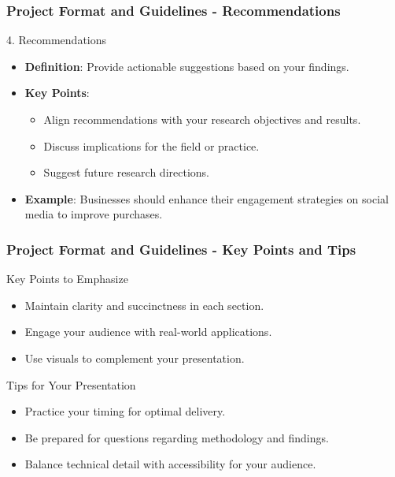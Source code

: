 \documentclass[aspectratio=169]{beamer}
\begin{document}
\begin{frame}[fragile]
    \frametitle{Project Format and Guidelines - Recommendations}
    \begin{block}{4. Recommendations}
        \begin{itemize}
            \item \textbf{Definition}: Provide actionable suggestions based on your findings.
            \item \textbf{Key Points}:
                \begin{itemize}
                    \item Align recommendations with your research objectives and results.
                    \item Discuss implications for the field or practice.
                    \item Suggest future research directions.
                \end{itemize}
            \item \textbf{Example}: Businesses should enhance their engagement strategies on social media to improve purchases.
        \end{itemize}
    \end{block}
\end{frame}

\begin{frame}[fragile]
    \frametitle{Project Format and Guidelines - Key Points and Tips}
    \begin{block}{Key Points to Emphasize}
        \begin{itemize}
            \item Maintain clarity and succinctness in each section.
            \item Engage your audience with real-world applications.
            \item Use visuals to complement your presentation.
        \end{itemize}
    \end{block}

    \begin{block}{Tips for Your Presentation}
        \begin{itemize}
            \item Practice your timing for optimal delivery.
            \item Be prepared for questions regarding methodology and findings.
            \item Balance technical detail with accessibility for your audience.
        \end{itemize}
    \end{block}
\end{frame}
\end{document}
